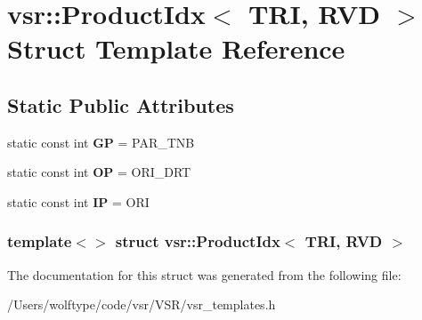 \hypertarget{structvsr_1_1_product_idx_3_01_t_r_i_00_01_r_v_d_01_4}{\section{vsr\-:\-:Product\-Idx$<$ T\-R\-I, R\-V\-D $>$ Struct Template Reference}
\label{structvsr_1_1_product_idx_3_01_t_r_i_00_01_r_v_d_01_4}
}
\subsection*{Static Public Attributes}
\begin{DoxyCompactItemize}
\item 
\hypertarget{structvsr_1_1_product_idx_3_01_t_r_i_00_01_r_v_d_01_4_af6832413a23e5fedfb998140595ee7fe}{static const int {\bfseries G\-P} = P\-A\-R\-\_\-\-T\-N\-B}\label{structvsr_1_1_product_idx_3_01_t_r_i_00_01_r_v_d_01_4_af6832413a23e5fedfb998140595ee7fe}

\item 
\hypertarget{structvsr_1_1_product_idx_3_01_t_r_i_00_01_r_v_d_01_4_a61fb3f2953ccaf44fc315c1469fbd8fa}{static const int {\bfseries O\-P} = O\-R\-I\-\_\-\-D\-R\-T}\label{structvsr_1_1_product_idx_3_01_t_r_i_00_01_r_v_d_01_4_a61fb3f2953ccaf44fc315c1469fbd8fa}

\item 
\hypertarget{structvsr_1_1_product_idx_3_01_t_r_i_00_01_r_v_d_01_4_a35f418f63b7cfda53db41e1e6abc1911}{static const int {\bfseries I\-P} = O\-R\-I}\label{structvsr_1_1_product_idx_3_01_t_r_i_00_01_r_v_d_01_4_a35f418f63b7cfda53db41e1e6abc1911}

\end{DoxyCompactItemize}
\subsubsection*{template$<$$>$ struct vsr\-::\-Product\-Idx$<$ T\-R\-I, R\-V\-D $>$}



The documentation for this struct was generated from the following file\-:\begin{DoxyCompactItemize}
\item 
/\-Users/wolftype/code/vsr/\-V\-S\-R/vsr\-\_\-templates.\-h\end{DoxyCompactItemize}
